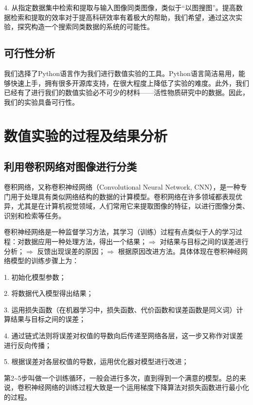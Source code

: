 4. 从指定数据集中检索和提取与输入图像同类图像，类似于“以图搜图”。提高数据检索和提取的效率对于提高科研效率有着极大的帮助，我们希望，通过这次实验，探究构造一个搜索同类数据的系统的可能性。

\subsection{可行性分析}
我们选择了Python语言作为我们进行数值实验的工具。Python语言简洁易用，能够快速上手，拥有很多开源库支持，在很大程度上降低了实验的难度。此外，我们已经有了进行我们的数值实验必不可少的材料——活性物质研究中的数据。因此，我们的实验具备可行性。


\section{数值实验的过程及结果分析}
\subsection{利用卷积网络对图像进行分类}
卷积网络，又称卷积神经网络（Convolutional Neural Network, CNN），是一种专门用于处理具有类似网络结构的数据的计算模型\cite{DL}。卷积网络在许多领域都表现优异，尤其是在计算机视觉领域，人们常用它来提取图像的特征，以进行图像分类、识别和检索等任务。

卷积神经网络是一种监督学习方法，其学习（训练）过程有点类似于人的学习过程：对数据应用一种处理方法，得出一个结果；$\Rightarrow$ 对结果与目标之间的误差进行分析；$\Rightarrow$ 反馈出现误差的原因；$\Rightarrow$ 根据原因改进方法。具体体现在卷积神经网络模型的训练步骤上为：

1. 初始化模型参数；

2. 将数据代入模型得出结果；

3. 运用损失函数（在机器学习中，损失函数、代价函数和误差函数是同义词\cite{DL}）计算结果与目标之间的误差；

4. 通过链式法则将误差对权值的导数向后传递至网络各层，这一步又称作对误差进行反向传播\cite{DL}；

5. 根据误差对各层权值的导数，运用优化器对模型进行改进；

第2\textasciitilde 5步叫做一个训练循环，一般会进行多次，直到得到一个满意的模型。总的来说，卷积神经网络的训练过程大致是一个运用梯度下降算法\cite{DL}对损失函数进行最小化的过程。

